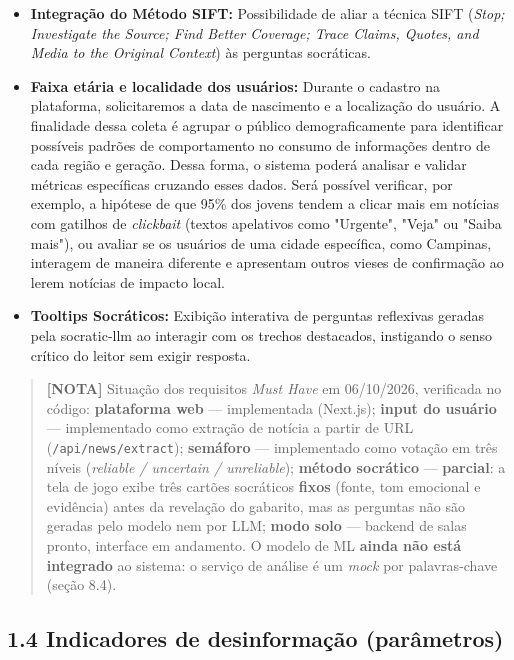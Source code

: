 \documentclass[
  brazilian,
  11pt,
]{article}
\providecommand{\tightlist}{%
  \setlength{\itemsep}{0pt}\setlength{\parskip}{0pt}}
\begin{document}
\begin{itemize}
\tightlist
\item
  \textbf{Integração do Método SIFT:} Possibilidade de aliar a técnica SIFT (\emph{Stop;} \emph{Investigate the Source; Find Better Coverage; Trace Claims, Quotes, and Media to the Original Context}) às perguntas socráticas.
\item
  \textbf{Faixa etária e localidade dos usuários:} Durante o cadastro na plataforma, solicitaremos a data de nascimento e a localização do usuário. A finalidade dessa coleta é agrupar o público demograficamente para identificar possíveis padrões de comportamento no consumo de informações dentro de cada região e geração. Dessa forma, o sistema poderá analisar e validar métricas específicas cruzando esses dados. Será possível verificar, por exemplo, a hipótese de que 95\% dos jovens tendem a clicar mais em notícias com gatilhos de \emph{clickbait} (textos apelativos como "Urgente", "Veja" ou "Saiba mais"), ou avaliar se os usuários de uma cidade específica, como Campinas, interagem de maneira diferente e apresentam outros vieses de confirmação ao lerem notícias de impacto local.
\item
  \textbf{Tooltips Socráticos:} Exibição interativa de perguntas reflexivas geradas pela socratic-llm ao interagir com os trechos destacados, instigando o senso crítico do leitor sem exigir resposta.
\end{itemize}

\begin{quote}
\textbf{{[}NOTA{]}} Situação dos requisitos \emph{Must Have} em 06/10/2026, verificada no código: \textbf{plataforma web} --- implementada (Next.js); \textbf{input do usuário} --- implementado como extração de notícia a partir de URL (\texttt{/api/news/extract}); \textbf{semáforo} --- implementado como votação em três níveis (\emph{reliable / uncertain / unreliable}); \textbf{método socrático} --- \textbf{parcial}: a tela de jogo exibe três cartões socráticos \textbf{fixos} (fonte, tom emocional e evidência) antes da revelação do gabarito, mas as perguntas não são geradas pelo modelo nem por LLM; \textbf{modo solo} --- backend de salas pronto, interface em andamento. O modelo de ML \textbf{ainda não está integrado} ao sistema: o serviço de análise é um \emph{mock} por palavras-chave (seção 8.4).
\end{quote}

\subsection{1.4 Indicadores de desinformação (parâmetros)}\label{indicadores-de-desinformauxe7uxe3o-paruxe2metros}
\end{document}
